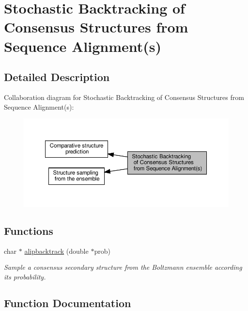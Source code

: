 \hypertarget{group__consensus__stochbt}{}\section{Stochastic Backtracking of Consensus Structures from Sequence Alignment(s)}
\label{group__consensus__stochbt}


\subsection{Detailed Description}
Collaboration diagram for Stochastic Backtracking of Consensus Structures from Sequence Alignment(s)\+:
\nopagebreak
\begin{figure}[H]
\begin{center}
\leavevmode
\includegraphics[width=350pt]{group__consensus__stochbt}
\end{center}
\end{figure}
\subsection*{Functions}
\begin{DoxyCompactItemize}
\item 
char $\ast$ \hyperlink{group__consensus__stochbt_ga0df40248788f0fb17ebdc59d74116d1c}{alipbacktrack} (double $\ast$prob)
\begin{DoxyCompactList}\small\item\em Sample a consensus secondary structure from the Boltzmann ensemble according its probability. \end{DoxyCompactList}\end{DoxyCompactItemize}


\subsection{Function Documentation}
\mbox{\label{group__consensus__stochbt_ga0df40248788f0fb17ebdc59d74116d1c}} 
